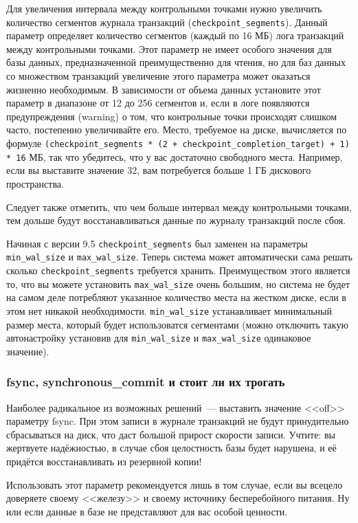 Для увеличения интервала между контрольными точками нужно увеличить количество сегментов журнала транзакций (\lstinline!checkpoint_segments!). Данный параметр определяет количество сегментов (каждый по 16 МБ) лога транзакций между контрольными точками. Этот параметр не имеет особого значения для базы данных, предназначенной преимущественно для чтения, но для баз данных со множеством транзакций увеличение этого параметра может оказаться жизненно необходимым. В зависимости от объема данных установите этот параметр в диапазоне от 12 до 256 сегментов и, если в логе появляются предупреждения (warning) о том, что контрольные точки происходят слишком часто, постепенно увеличивайте его. Место, требуемое на диске, вычисляется по формуле \lstinline!(checkpoint_segments * (2 + checkpoint_completion_target) + 1) * 16! МБ, так что убедитесь, что у вас достаточно свободного места. Например, если вы выставите значение 32, вам потребуется больше 1 ГБ дискового пространства.

Следует также отметить, что чем больше интервал между контрольными точками, тем дольше будут восстанавливаться данные по журналу транзакций после сбоя.

Начиная с версии 9.5 \lstinline!checkpoint_segments! был заменен на параметры \lstinline!min_wal_size! и \lstinline!max_wal_size!. Теперь система может автоматически сама решать сколько \lstinline!checkpoint_segments! требуется хранить. Преимуществом этого является то, что вы можете установить \lstinline!max_wal_size! очень большим, но система не будет на самом деле потребляют указанное количество места на жестком диске, если в этом нет никакой необходимости. \lstinline!min_wal_size! устанавливает минимальный размер места, который будет использоватся сегментами (можно отключить такую автонастройку установив для \lstinline!min_wal_size! и \lstinline!max_wal_size! одинаковое значение).

\subsubsection{fsync, synchronous\_commit и стоит ли их трогать}

Наиболее радикальное из возможных решений~--- выставить значение <<off>> параметру fsync. При этом записи в журнале транзакций не будут принудительно сбрасываться на диск, что даст большой прирост скорости записи. Учтите: вы жертвуете надёжностью, в случае сбоя целостность базы будет нарушена, и её придётся восстанавливать из резервной копии!

Использовать этот параметр рекомендуется лишь в том случае, если вы всецело доверяете своему <<железу>> и своему источнику бесперебойного питания. Ну или если данные в базе не представляют для вас особой ценности.

